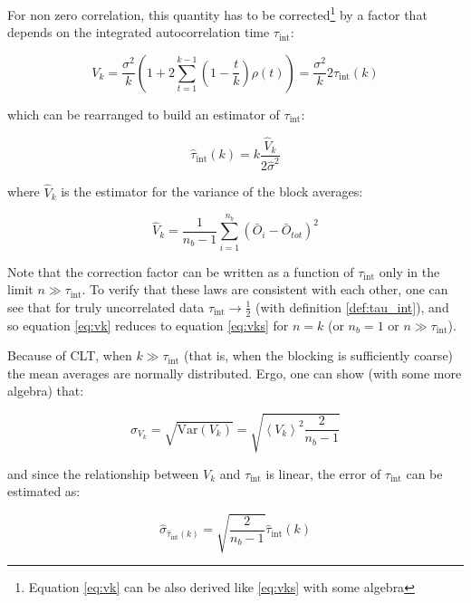 For non zero correlation, this quantity has to be corrected\footnote{Equation \ref{eq:vk} can be also derived like \ref{eq:vks} with some algebra} by a factor that depends on the integrated autocorrelation time $\tau_{\text{int}}$:

\begin{equation}
	\label{eq:vk}
	V_k = \frac{\sigma^2}{k} (1 + 2 \sum_{t = 1}^{k - 1} (1 - \frac{t}{k}) \rho(t)) = \frac{\sigma^2}{k} 2 \tau_{\text{int}}(k)
\end{equation}

which can be rearranged to build an estimator of $\tau_{\text{int}}$:

\begin{equation}
    \label{eq:tau_blocking}
	\hat{\tau}_{\text{int}}(k) = k \frac{\hat{V}_k}{2 \hat{\sigma}^2}
\end{equation}

where $\hat{V}_k$ is the estimator for the variance of the block averages:

\begin{equation}
    \hat{V}_k = \frac{1}{n_b - 1} \sum_{i=1}^{n_b} (\bar{O}_i - \bar{O}_{tot})^2
\end{equation}

Note that the correction factor can be written as a function of $\tau_{\text{int}}$ only in the limit $n \gg \tau_{\text{int}}$.
To verify that these laws are consistent with each other, one can see that for truly uncorrelated data $\tau_{\text{int}} \to \frac{1}{2}$ (with definition \ref{def:tau_int}), and so equation \ref{eq:vk} reduces to equation \ref{eq:vks} for $n = k$ (or $n_b = 1$ or $n \gg \tau_{\text{int}}$). 

Because of CLT, when $k \gg \tau_{\text{int}}$ (that is, when the blocking is sufficiently coarse) the mean averages are normally distributed. Ergo, one can show (with some more algebra) that:

\begin{equation}
    \label{eq:vk_error}
    \sigma_{V_k} = \sqrt{\mathrm{Var}(V_k)} = \sqrt{{\left\langle V_k \right\rangle}^2 \frac{2}{n_b - 1}}
\end{equation}

and since the relationship between $V_k$ and $\tau_{\text{int}}$ is linear, the error of $\tau_{\text{int}}$ can be estimated as:

\begin{equation}
    \label{eq:tau_blocking_error}
    \hat{\sigma}_{\hat{\tau}_{\text{int}}(k)} = \sqrt{\frac{2}{n_b - 1}} \hat{\tau}_{\text{int}}(k)
\end{equation}


